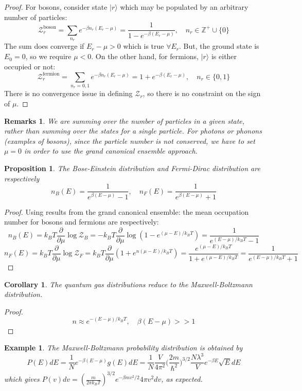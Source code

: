 \documentclass[a4paper]{article}
\newtheorem{eg}{Example}[section]
\newtheorem{remarks}{Remarks}[section]
\theoremstyle{new}
\newtheorem{prop}{Proposition}[section]
\newtheorem{cor}{Corollary}[section]
\begin{document}
\begin{proof}
For bosons, consider state $|r\rangle$ which may be populated by an arbitrary number of particles:
$$\mathcal{Z}^{\text{boson}}_r=\sum_{n_r}e^{-\beta n_r(E_r-\mu)}=\frac{1}{1-e^{-\beta(E_r-\mu)}},\quad n_r\in\mathbb{Z}^+\cup\{0\}$$
The sum does converge if $E_r-\mu>0$ which is true $\forall E_r$. But, the ground state is $E_0=0$, so we require $\mu<0$. On the other hand, for fermions, $|r\rangle$ is either occupied or not:
$$\mathcal{Z}^{\text{fermion}}_r=\sum_{n_r=0,1}e^{-\beta n_r(E_r-\mu)}=1+e^{-\beta(E_r-\mu)},\quad n_r\in\{0,1\}$$
There is no convergence issue in defining $\mathcal{Z}_r$, so there is no constraint on the sign of $\mu$.
\end{proof}
\begin{remarks}
We are summing over the number of particles in a given state, rather than summing over the states for a single particle. For photons or phonons (examples of bosons), since the particle number is not conserved, we have to set $\mu=0$ in order to use the grand canonical ensemble approach.
\end{remarks}
\begin{prop}
The Bose-Einstein distribution and Fermi-Dirac distribution are respectively
$$n_B(E)=\frac{1}{e^{\beta(E-\mu)}-1},\quad n_F(E)=\frac{1}{e^{\beta(E-\mu)}+1}$$
\end{prop}
\begin{proof}
Using results from the grand canonical ensemble: the mean occupation number for bosons and fermions are respectively:
$$n_B(E)=k_BT\frac{\partial}{\partial\mu}\log \mathcal{Z}_B=-k_BT\frac{\partial}{\partial\mu}\log(1-e^{(\mu-E)/k_BT})=\frac{1}{e^{(E-\mu)/k_BT}-1}$$
$$n_F(E)=k_BT\frac{\partial}{\partial\mu}\log\mathcal{Z}_F=k_BT\frac{\partial}{\partial\mu}(1+e^{n(\mu-E)/k_BT})=\frac{e^{(\mu-E)/k_BT}}{1+e^{(\mu-E)/k_BT}}=\frac{1}{e^{(E-\mu)/k_BT}+1}$$
\end{proof}
\begin{cor}
The quantum gas distributions reduce to the Maxwell-Boltzmann distribution.
\end{cor}
\begin{proof}
$$n\approx e^{-(E-\mu)/k_BT},\quad \beta(E-\mu)>>1$$
\end{proof}
\begin{eg}
The Maxwell-Boltzmann probability distribution is obtained by
$$P(E)dE=\frac{1}{N}e^{-\beta(E-\mu)}g(E)dE=\frac{1}{N}\frac{V}{4\pi^2}\bigg(\frac{2m}{\hbar^2}\bigg)^{3/2}\frac{N\lambda^3}{V}e^{-\beta E}\sqrt{E}dE$$
which gives $P(v)dv=(\frac{m}{2\pi k_BT})^{3/2}e^{-\beta mv^2/2}4\pi v^2dv$, as expected.
\end{eg}
\end{document}
